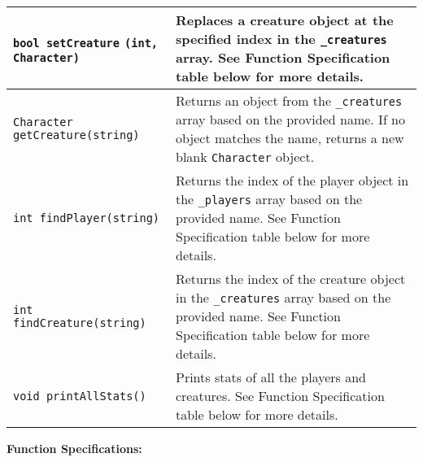 \begin{longtable}{|p{2.0in}|p{4.0in}|}
\texttt{bool setCreature} \newline \texttt{(int, Character)} & Replaces a creature object at the specified index in the \texttt{_creatures} array. See Function Specification table below for more details. \\ \hline

\texttt{Character getCreature(string)} & Returns an object from the \texttt{_creatures} array based on the provided name. If no object matches the name, returns a new blank \texttt{Character} object. \\ \hline

\texttt{int findPlayer(string)} & Returns the index of the player object in the \texttt{_players} array based on the provided name. See Function Specification table below for more details. \\ \hline

\texttt{int findCreature(string)} & Returns the index of the creature object in the \texttt{_creatures} array based on the provided name. See Function Specification table below for more details. \\ \hline

\texttt{void printAllStats()} & Prints stats of all the players and creatures. See Function Specification table below for more details. \\ \hline

\end{longtable}












\textbf{Function Specifications:}

